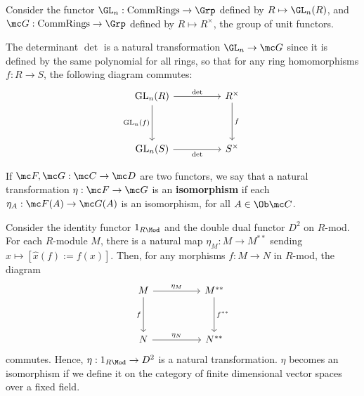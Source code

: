 \begin{ex}
    Consider the functor $\GL_n:\text{CommRings} \to \Grp$ defined by $R \mapsto \GL_n(R)$, and $\mc G : \text{CommRings}\to \Grp$ defined by $R \mapsto R^\times$, the group of unit functors.

    The determinant $\det$ is a natural transformation $\GL_n \to \mc G$ since it is defined by the same polynomial for all rings, so that for any ring homomorphisms $f : R \to S$, the following diagram commutes:
    \[\begin{tikzcd}[ampersand replacement=\&]
    	{\text{GL}_n(R)} \&\& {R^\times} \\
    	\\
    	{\text{GL}_n(S)} \&\& {S^\times}
    	\arrow["\det", from=1-1, to=1-3]
    	\arrow["{\text{GL}_n(f)}"', from=1-1, to=3-1]
    	\arrow["f", from=1-3, to=3-3]
    	\arrow["\det"', from=3-1, to=3-3]
    \end{tikzcd}\]
\end{ex}

\begin{defn}
    If $\mc F, \mc G : \mc C \to \mc D$ are two functors, we say that a natural transformation $\eta : \mc F \to \mc G$ is an \textbf{isomorphism} if each $\eta_A : \mc F(A) \to \mc G(A)$ is an isomorphism, for all $A \in \Ob \mc C$.
\end{defn}

\begin{ex}
    Consider the identity functor $1_{R\Mod}$ and the double dual functor $D^2$ on $R$-mod. For each $R$-module $M$, there is a natural map $\eta_M : M \to M^{**}$ sending $x \mapsto [ \hat x (f) := f(x)].$ Then, for any morphisms $f:M \to N$ in $R$-mod, the diagram
    \[\begin{tikzcd}[ampersand replacement=\&]
    	M \&\& {M^{**}} \\
    	\\
    	N \&\& {N^{**}}
    	\arrow["{\eta_M}", from=1-1, to=1-3]
    	\arrow["f"', from=1-1, to=3-1]
    	\arrow["{f^{**}}", from=1-3, to=3-3]
    	\arrow["{\eta_N}", from=3-1, to=3-3]
    \end{tikzcd}\] commutes. Hence, $\eta : 1_{R\Mod} \to D^2$ is a natural transformation. $\eta$ becomes an isomorphism if we define it on the category of finite dimensional vector spaces over a fixed field.
\end{ex}

